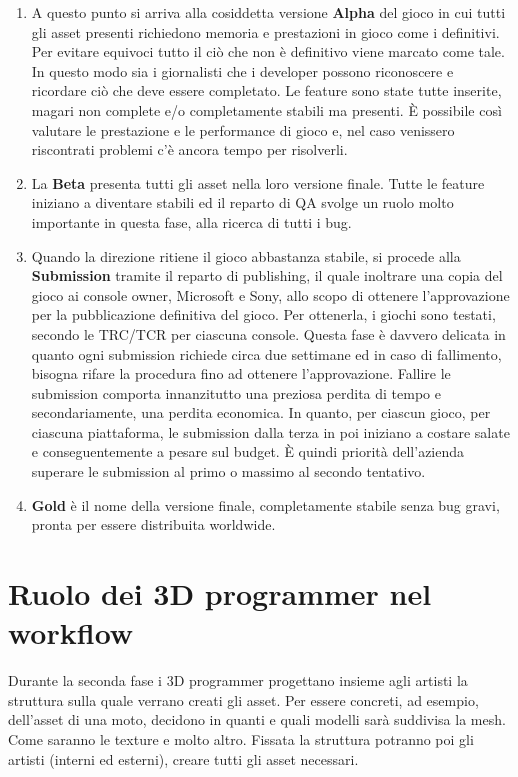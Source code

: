 \begin{enumerate}
	\item A questo punto si arriva alla cosiddetta versione \textbf{Alpha} del gioco in cui tutti gli asset presenti richiedono memoria e prestazioni in gioco come i definitivi. Per evitare equivoci tutto il ciò che non è definitivo viene marcato come tale. In questo modo sia i giornalisti che i developer possono riconoscere e ricordare ciò che deve essere completato. Le feature sono state tutte inserite, magari non complete e/o completamente stabili ma presenti. È possibile così valutare le prestazione e le performance di gioco e, nel caso venissero riscontrati problemi c'è ancora tempo per risolverli.
	\item La \textbf{Beta} presenta tutti gli asset nella loro versione finale. Tutte le feature iniziano a diventare stabili ed il reparto di QA svolge un ruolo molto importante in questa fase, alla ricerca di tutti i bug.
	\item Quando la direzione ritiene il gioco abbastanza stabile, si procede alla \textbf{Submission} tramite il reparto di publishing, il quale inoltrare una copia del gioco ai console owner, Microsoft e Sony, allo scopo di ottenere l'approvazione per la pubblicazione definitiva del gioco. Per ottenerla, i giochi sono testati, secondo le TRC/TCR per ciascuna console. Questa fase è davvero delicata in quanto ogni submission richiede circa due settimane ed in caso di fallimento, bisogna rifare la procedura fino ad ottenere l'approvazione. Fallire le submission comporta innanzitutto una preziosa perdita di tempo e secondariamente, una perdita economica. In quanto, per ciascun gioco, per ciascuna piattaforma, le submission dalla terza in poi iniziano a costare salate e conseguentemente a pesare sul budget. È quindi priorità dell'azienda superare le submission al primo o massimo al secondo tentativo.
	\item \textbf{Gold} è il nome della versione finale, completamente stabile senza bug gravi, pronta per essere distribuita worldwide.
\end{enumerate}

\section{Ruolo dei 3D programmer nel workflow}
\label{sec:ruolo-3D-programmer-workflow}

Durante la seconda fase i 3D programmer progettano insieme agli artisti la struttura sulla quale verrano creati gli asset. Per essere concreti, ad esempio, dell'asset di una moto, decidono in quanti e quali modelli sarà suddivisa la \gls{mesh}. Come saranno le \gls{texture} e molto altro. Fissata la struttura potranno poi gli artisti (interni ed esterni), creare tutti gli asset necessari.\\

